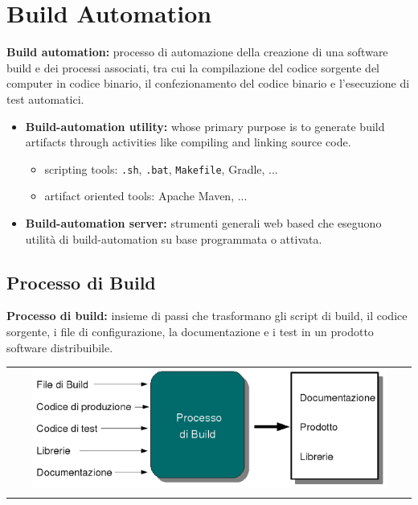 \section{Build Automation}

\begin{mdframed}
    \textbf{Build automation:} processo di automazione della creazione di una software build e dei processi associati, tra cui la compilazione del codice sorgente del computer in codice binario, il confezionamento del codice binario e l'esecuzione di test automatici.
\end{mdframed}
\begin{itemize}
    \item \textbf{Build-automation utility:} whose primary purpose is to generate build artifacts through activities like compiling and linking source code.
    \begin{itemize}
        \item scripting tools: \verb|.sh|, \verb|.bat|, \verb|Makefile|, Gradle, ...
        \item artifact oriented tools: Apache Maven, ...
    \end{itemize}
    \item \textbf{Build-automation server:} strumenti generali web based che eseguono utilità di build-automation su base programmata o attivata.
\end{itemize}

\subsection{Processo di Build}
\begin{mdframed}
    \textbf{Processo di build:} insieme di passi che trasformano gli script di build, il codice sorgente, i file di configurazione, la documentazione e i test in un prodotto software distribuibile.
\end{mdframed}
\begin{center}
    \begin{tabular}{c}
        \\ \includegraphics[width=0.9\textwidth]{images/Build1.png} \\ \\
    \end{tabular}
\end{center}

